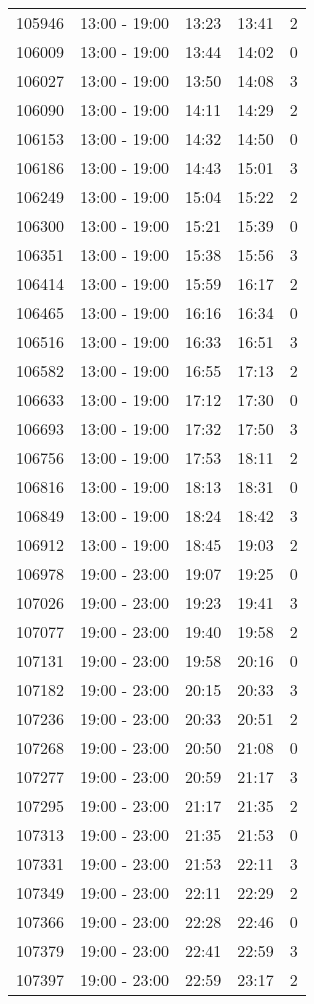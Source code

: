\documentclass{article}
\begin{document}
\begin{tabular}{llccc}
105946 & 13:00 - 19:00 & 13:23 & 13:41 & 2 \\
106009 & 13:00 - 19:00 & 13:44 & 14:02 & 0 \\
106027 & 13:00 - 19:00 & 13:50 & 14:08 & 3 \\
106090 & 13:00 - 19:00 & 14:11 & 14:29 & 2 \\
106153 & 13:00 - 19:00 & 14:32 & 14:50 & 0 \\
106186 & 13:00 - 19:00 & 14:43 & 15:01 & 3 \\
106249 & 13:00 - 19:00 & 15:04 & 15:22 & 2 \\
106300 & 13:00 - 19:00 & 15:21 & 15:39 & 0 \\
106351 & 13:00 - 19:00 & 15:38 & 15:56 & 3 \\
106414 & 13:00 - 19:00 & 15:59 & 16:17 & 2 \\
106465 & 13:00 - 19:00 & 16:16 & 16:34 & 0 \\
106516 & 13:00 - 19:00 & 16:33 & 16:51 & 3 \\
106582 & 13:00 - 19:00 & 16:55 & 17:13 & 2 \\
106633 & 13:00 - 19:00 & 17:12 & 17:30 & 0 \\
106693 & 13:00 - 19:00 & 17:32 & 17:50 & 3 \\
106756 & 13:00 - 19:00 & 17:53 & 18:11 & 2 \\
106816 & 13:00 - 19:00 & 18:13 & 18:31 & 0 \\
106849 & 13:00 - 19:00 & 18:24 & 18:42 & 3 \\
106912 & 13:00 - 19:00 & 18:45 & 19:03 & 2 \\
106978 & 19:00 - 23:00 & 19:07 & 19:25 & 0 \\
107026 & 19:00 - 23:00 & 19:23 & 19:41 & 3 \\
107077 & 19:00 - 23:00 & 19:40 & 19:58 & 2 \\
107131 & 19:00 - 23:00 & 19:58 & 20:16 & 0 \\
107182 & 19:00 - 23:00 & 20:15 & 20:33 & 3 \\
107236 & 19:00 - 23:00 & 20:33 & 20:51 & 2 \\
107268 & 19:00 - 23:00 & 20:50 & 21:08 & 0 \\
107277 & 19:00 - 23:00 & 20:59 & 21:17 & 3 \\
107295 & 19:00 - 23:00 & 21:17 & 21:35 & 2 \\
107313 & 19:00 - 23:00 & 21:35 & 21:53 & 0 \\
107331 & 19:00 - 23:00 & 21:53 & 22:11 & 3 \\
107349 & 19:00 - 23:00 & 22:11 & 22:29 & 2 \\
107366 & 19:00 - 23:00 & 22:28 & 22:46 & 0 \\
107379 & 19:00 - 23:00 & 22:41 & 22:59 & 3 \\
107397 & 19:00 - 23:00 & 22:59 & 23:17 & 2 \\
\bottomrule
\end{tabular}
\end{document}
